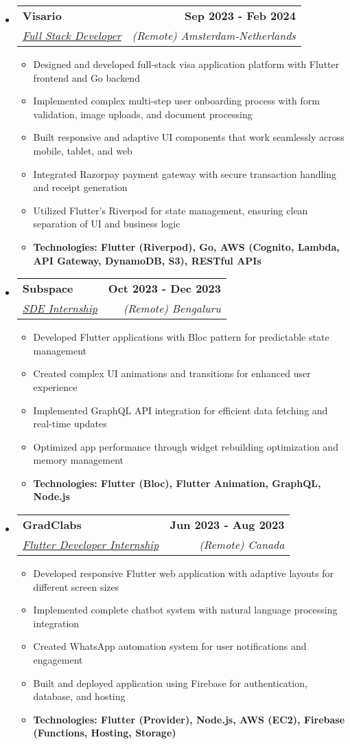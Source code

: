 \documentclass[letterpaper,11pt]{article}
\makeatletter
\newcommand{\resumeItem}[1]{
  \item\small{
    {#1 \vspace{-2pt}}
  }
}
\newcommand{\resumeSubheading}[4]{
  \vspace{-2pt}\item
    \begin{tabular*}{1.0\textwidth}[t]{l@{\extracolsep{\fill}}r}
      \textbf{\large#1} & \textbf{\small #2} \\
      \textit{\large#3} & \textit{\small #4} \\
      
    \end{tabular*}\vspace{-7pt}
}
\newcommand{\resumeSubHeadingListStart}{\begin{itemize}[leftmargin=0.0in, label={}]}
\newcommand{\resumeSubHeadingListEnd}{\end{itemize}}
\newcommand{\resumeItemListStart}{\begin{itemize}}
\newcommand{\resumeItemListEnd}{\end{itemize}\vspace{-5pt}}
\makeatother
\begin{document}
   \resumeSubHeadingListStart

    \resumeSubheading
      {Visario\href{https://www.myvisario.com/}{\raisebox{-0.1\height}\faLink }}{Sep 2023 - Feb 2024} 
      {\underline{Full Stack Developer}}{(Remote) Amsterdam-Netherlands}
      \resumeItemListStart
        \resumeItem{\normalsize{Designed and developed full-stack visa application platform with Flutter frontend and Go backend}}
        \resumeItem{\normalsize{Implemented complex multi-step user onboarding process with form validation, image uploads, and document processing}}
        \resumeItem{\normalsize{Built responsive and adaptive UI components that work seamlessly across mobile, tablet, and web}}
        \resumeItem{\normalsize{Integrated Razorpay payment gateway with secure transaction handling and receipt generation}}
        \resumeItem{\normalsize{Utilized Flutter's Riverpod for state management, ensuring clean separation of UI and business logic}}
        \resumeItem{\normalsize{\textbf{Technologies: Flutter (Riverpod), Go, AWS (Cognito, Lambda, API Gateway, DynamoDB, S3), RESTful APIs}}}
      \resumeItemListEnd  
  \resumeSubHeadingListEnd

 \resumeSubHeadingListStart
    \resumeSubheading
      {Subspace\href{https://subspace.money/}{\raisebox{-0.1\height}\faLink }}{Oct 2023 - Dec 2023} 
      {\underline{SDE Internship}}{(Remote) Bengaluru}
      \resumeItemListStart
        \resumeItem{\normalsize{Developed Flutter applications with Bloc pattern for predictable state management}}
        \resumeItem{\normalsize{Created complex UI animations and transitions for enhanced user experience}}
        \resumeItem{\normalsize{Implemented GraphQL API integration for efficient data fetching and real-time updates}}
        \resumeItem{\normalsize{Optimized app performance through widget rebuilding optimization and memory management}}
        \resumeItem{\normalsize{\textbf{Technologies: Flutter (Bloc), Flutter Animation, GraphQL, Node.js}}}
      \resumeItemListEnd  
  \resumeSubHeadingListEnd

   \resumeSubHeadingListStart
    \resumeSubheading
      {GradClabs \href{https://gradclubs.app/}{\raisebox{-0.1\height}\faLink }}{ Jun 2023 - Aug 2023} 
      {\underline{Flutter Developer Internship}}{(Remote) Canada}
      \resumeItemListStart
        \resumeItem{\normalsize{Developed responsive Flutter web application with adaptive layouts for different screen sizes}}
        \resumeItem{\normalsize{Implemented complete chatbot system with natural language processing integration}}
        \resumeItem{\normalsize{Created WhatsApp automation system for user notifications and engagement}}
        \resumeItem{\normalsize{Built and deployed application using Firebase for authentication, database, and hosting}}
        \resumeItem{\normalsize{\textbf{Technologies: Flutter (Provider), Node.js, AWS (EC2), Firebase (Functions, Hosting, Storage)}}}
      \resumeItemListEnd  
  \resumeSubHeadingListEnd
\end{document}
